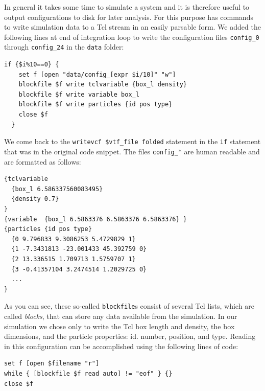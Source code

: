 \documentclass[
a4paper,                        %
11pt,                           %
twoside,                        %
footsepline,                    %
headsepline,                    %
headexclude,                    %
footexclude,                    %
pagesize,                       %
]{scrartcl}
\begin{document}
In general it takes some time to simulate a system and it is therefore useful to output configurations to disk for later analysis. For this purpose \es{} has commands to write simulation data to a Tcl stream in an easily parsable form. We added the following lines at end of integration loop to write the configuration files \texttt{config\_0} through \texttt{config\_24} in the \texttt{data} folder:

{\vspace{0,2cm}\small
\begin{lstlisting}[numbers=none]
  if {$i%10==0} {
    set f [open "data/config_[expr $i/10]" "w"]
    blockfile $f write tclvariable {box_l density}
    blockfile $f write variable box_l
    blockfile $f write particles {id pos type}
    close $f
  }
\end{lstlisting}\vspace{0,2cm}
}

\noindent We come back to the \texttt{writevcf \$vtf\_file folded} statement in the \verb|if| statement that was in the original code snippet. The files \texttt{config\_$\ast$} are human readable and are formatted as follows:

{\small\vspace{0,2cm}
\begin{verbatim}
{tclvariable 
  {box_l 6.586337560083495}
  {density 0.7}
}
{variable  {box_l 6.5863376 6.5863376 6.5863376} }
{particles {id pos type} 
  {0 9.796833 9.3086253 5.4729829 1}
  {1 -7.3431813 -23.001433 45.392759 0}
  {2 13.336515 1.709713 1.5759707 1}
  {3 -0.41357104 3.2474514 1.2029725 0}
  ...
}
\end{verbatim}
\vspace{0,2cm}
}

\noindent As you can see, these so-called \texttt{blockfile}s consist of several Tcl lists, which are called \emph{blocks}, that can store any data available from the simulation. In our simulation we chose only to write the Tcl box length and density, the \es{} box dimensions, and the particle properties: id. number, position, and type. Reading in this configuration can be accomplished using the following lines of code:

{\vspace{0,2cm}\small
\begin{lstlisting}[numbers=none]
set f [open $filename "r"]
while { [blockfile $f read auto] != "eof" } {}
close $f
\end{lstlisting}\vspace{0,2cm}
}
\end{document}
